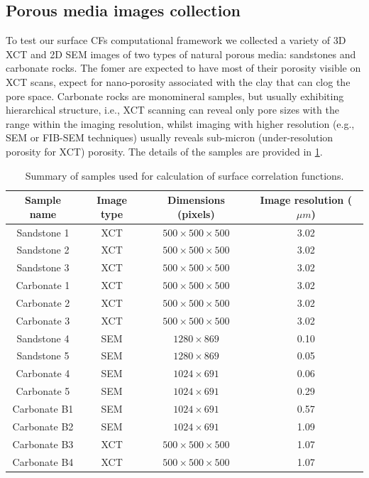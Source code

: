 \documentclass[reprint,amsmath,amssymb,aps,pre,showkeys,showpacs]{revtex4-1}
\begin{document}
\subsection{Porous media images collection}
To test our surface CFs computational framework we collected a variety of 3D XCT
and 2D SEM images of two types of natural porous media: sandstones and carbonate
rocks. The fomer are expected to have most of their porosity visible on XCT
scans, expect for nano-porosity associated with the clay that can clog the pore
space. Carbonate rocks are monomineral samples, but usually exhibiting
hierarchical structure, i.e., XCT scanning can reveal only pore sizes with the
range within the imaging resolution, whilst imaging with higher resolution
(e.g., SEM or FIB-SEM techniques) usually reveals sub-micron (under-resolution
porosity for XCT) porosity. The details of the samples are provided in
\cref{tab:samples}.

\begin{table}[!pt]
  \centering
  \begin{ruledtabular}
    \begin{tabular}{|c|c|c|c|}
      Sample name & Image type & Dimensions (pixels) & Image resolution ($\mu m$) \\
      \hline
      Sandstone 1 & XCT & $500 \times 500 \times 500$ & 3.02 \\
      Sandstone 2 & XCT & $500 \times 500 \times 500$ & 3.02 \\
      Sandstone 3 & XCT & $500 \times 500 \times 500$ & 3.02 \\
      Carbonate 1 & XCT & $500 \times 500 \times 500$ & 3.02 \\
      Carbonate 2 & XCT & $500 \times 500 \times 500$ & 3.02 \\
      Carbonate 3 & XCT & $500 \times 500 \times 500$ & 3.02 \\
      Sandstone 4 & SEM &  $1280 \times 869$ & 0.10 \\
      Sandstone 5 & SEM &  $1280 \times 869$ & 0.05 \\
      Carbonate 4 & SEM &  $1024 \times 691$ & 0.06 \\
      Carbonate 5 & SEM &  $1024 \times 691$ & 0.29 \\
      Carbonate B1 & SEM & $1024 \times 691$ & 0.57 \\
      Carbonate B2 & SEM & $1024 \times 691$ & 1.09 \\
      Carbonate B3 & XCT & $500 \times 500 \times 500$ & 1.07 \\
      Carbonate B4 & XCT & $500 \times 500 \times 500$ & 1.07
    \end{tabular}
  \end{ruledtabular}
  \caption{Summary of samples used for calculation of surface correlation
    functions.}
  \label{tab:samples}
\end{table}
\end{document}
